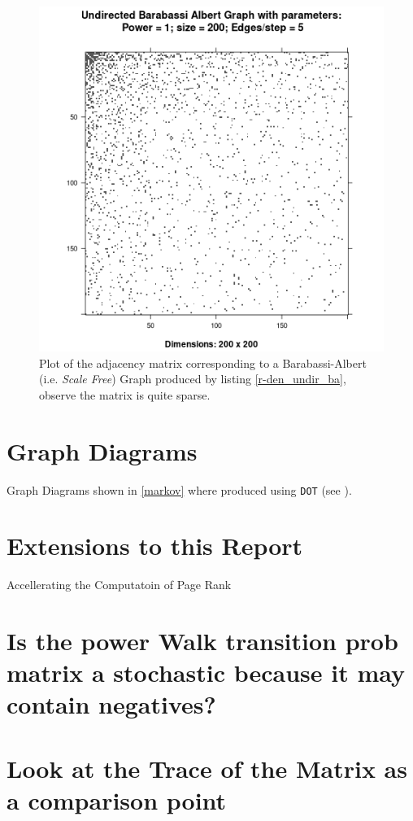 \documentclass[11pt]{article}
\begin{document}
\begin{figure}[htbp]
\centering
\includegraphics[width=12cm]{media/DensityUndirectedBA.png}
\caption{\label{fig:den_undir_ba}Plot of the adjacency matrix corresponding to a Barabassi-Albert (i.e. \emph{Scale Free}) Graph produced by listing \ref{r-den_undir_ba}, observe the matrix is quite sparse.}
\end{figure}
\section{Graph Diagrams}
\label{sec:org5e801b5}
Graph Diagrams shown in \ref{markov} where produced using \texttt{DOT} (see \cite{DOTLanguage,DOTGraphDescription2020}).
\section{Extensions to this Report}
\label{sec:orge1cc574}
Accellerating the Computatoin of Page Rank \cite{langvilleGooglePageRankScience2012}

\section{Is the power Walk transition prob matrix a stochastic because it may contain negatives?}
\label{sec:org3876a23}
\section{Look at the Trace of the Matrix as a comparison point}
\label{sec:org36db485}
\end{document}

